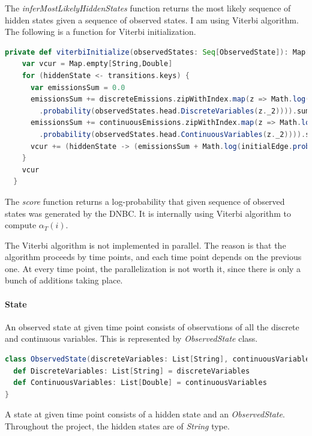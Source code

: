 \documentclass[thesis=B,english]{FITthesis}[2012/06/26]
\begin{document}
The \textit{inferMostLikelyHiddenStates} function returns the most likely sequence of hidden states given a sequence of observed states. I am using Viterbi algorithm. The following is a function for Viterbi initialization.

\begin{lstlisting}[language=Scala]
  private def viterbiInitialize(observedStates: Seq[ObservedState]): Map[String,Double] = {
    var vcur = Map.empty[String,Double]
    for (hiddenState <- transitions.keys) {
      var emissionsSum = 0.0
      emissionsSum += discreteEmissions.zipWithIndex.map(z => Math.log(z._1(hiddenState)
        .probability(observedStates.head.DiscreteVariables(z._2)))).sum
      emissionsSum += continuousEmissions.zipWithIndex.map(z => Math.log(z._1(hiddenState)
        .probability(observedStates.head.ContinuousVariables(z._2)))).sum
      vcur += (hiddenState -> (emissionsSum + Math.log(initialEdge.probability(hiddenState))))
    }
    vcur
  }
\end{lstlisting}

The \textit{score} function returns a log-probability that given sequence of observed states was generated by the DNBC. It is internally using Viterbi algorithm to compute $\alpha_T(i)$.

The Viterbi algorithm is not implemented in parallel. The reason is that the algorithm proceeds by time points, and each time point depends on the previous one. At every time point, the parallelization is not worth it, since there is only a bunch of additions taking place.

\paragraph{State}

An observed state at given time point consists of observations of all the discrete and continuous variables. This is represented by \textit{ObservedState} class.

\begin{lstlisting}[language=Scala]
class ObservedState(discreteVariables: List[String], continuousVariables: List[Double]) {
  def DiscreteVariables: List[String] = discreteVariables
  def ContinuousVariables: List[Double] = continuousVariables
}
\end{lstlisting}

A state at given time point consists of a hidden state and an \textit{ObservedState}. Throughout the project, the hidden states are of \textit{String} type.
\end{document}
